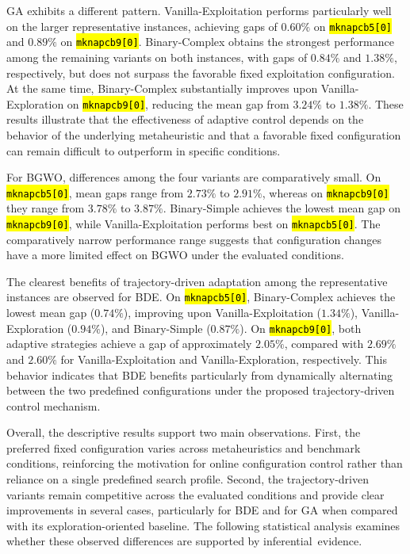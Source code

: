 \documentclass[mathematics,article,accept,moreauthors]{Definitions/mdpi}
\begin{document}
GA exhibits a different pattern. Vanilla-Exploitation performs particularly
well on the larger representative instances, achieving gaps of $0.60\%$ on
\texttt{\hl{mknapcb5[0]}} and $0.89\%$ on \texttt{\hl{mknapcb9[0]}}. Binary-Complex obtains
the strongest performance among the remaining variants on both instances,
with gaps of $0.84\%$ and $1.38\%$, respectively, but does not surpass the
favorable fixed exploitation configuration. At the same time, Binary-Complex
substantially improves upon Vanilla-Exploration on \texttt{\hl{mknapcb9[0]}},
reducing the mean gap from $3.24\%$ to $1.38\%$. These results illustrate
that the effectiveness of adaptive control depends on the behavior of the
underlying metaheuristic and that a favorable fixed configuration can remain
difficult to outperform in specific conditions.

For BGWO, differences among the four variants are comparatively small.
On \texttt{\hl{mknapcb5[0]}}, mean gaps range from $2.73\%$ to $2.91\%$, whereas
on \texttt{\hl{mknapcb9[0]}} they range from $3.78\%$ to $3.87\%$. Binary-Simple
achieves the lowest mean gap on \texttt{\hl{mknapcb9[0]}}, while
Vanilla-Exploitation performs best on \texttt{\hl{mknapcb5[0]}}. The comparatively
narrow performance range suggests that configuration changes have a more
limited effect on BGWO under the evaluated conditions.

The clearest benefits of trajectory-driven adaptation among the
representative instances are observed for BDE. On \texttt{\hl{mknapcb5[0]}},
Binary-Complex achieves the lowest mean gap ($0.74\%$), improving upon
Vanilla-Exploitation ($1.34\%$), Vanilla-Exploration ($0.94\%$), and
Binary-Simple ($0.87\%$). On \texttt{\hl{mknapcb9[0]}}, both adaptive strategies
achieve a gap of approximately $2.05\%$, compared with $2.69\%$ and
$2.60\%$ for Vanilla-Exploitation and Vanilla-Exploration, respectively.
This behavior indicates that BDE benefits particularly from dynamically
alternating between the two predefined configurations under the proposed
trajectory-driven control mechanism.

Overall, the descriptive results support two main observations. First, the
preferred fixed configuration varies across metaheuristics and benchmark
conditions, reinforcing the motivation for online configuration control
rather than reliance on a single predefined search profile. Second, the
trajectory-driven variants remain competitive across the evaluated
conditions and provide clear improvements in several cases, particularly
for BDE and for GA when compared with its exploration-oriented baseline.
The following statistical analysis examines whether these observed
differences are supported by \mbox{inferential evidence.}
\end{document}
